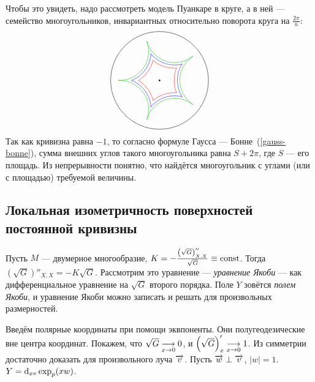 \documentclass[a4paper]{report}
\begin{document}
{{{            Чтобы это увидеть, надо рассмотреть модель Пуанкаре в круге, а в ней --- семейство многоугольников, инвариантных относительно поворота круга на $\frac{2\pi}{n}$:
            \[\begin{tikzpicture}
                  \draw (0, 0) circle (2);
                  \fill (0, 0) circle (1pt);
                  \pgfmathsetmacro{\r}{1.4} %
                  \foreach \i in {0,1,...,4} {
                      \draw[red,smooth,domain={(2.2+\i)*72}:{(2.8+\i)*72}] plot ({\r*cos(\x)+2*cos(72*\i)}, {\r*sin(\x)+2*sin(72*\i)});
                  }
                  \pgfmathsetmacro{\r}{1.27} %
                  \foreach \i in {0,1,...,4} {
                    \draw[blue,smooth,domain={(2.05+\i)*72}:{(2.95+\i)*72}] plot ({\r*cos(\x)+2*cos(72*\i)}, {\r*sin(\x)+2*sin(72*\i)});
                  }
                  \pgfmathsetmacro{\r}{1.17} %
                  \foreach \i in {0,1,...,4} {
                    \draw[darkgreen,smooth,domain={(1.7+\i)*72}:{(3.3+\i)*72}] plot ({\r*cos(\x)+2*cos(72*\i)}, {\r*sin(\x)+2*sin(72*\i)});
                  }
            \end{tikzpicture}\]
            Так как кривизна равна $-1$, то согласно формуле Гаусса --- Бонне~(\cref{gauss-bonne}), сумма внешних углов такого многоугольника равна $S+2\pi$, где $S$ --- его площадь.
            Из непрерывности понятно, что найдётся многоугольник с углами (или с площадью) требуемой величины.\qedhere
            }
        }
    }
    \subsection{Локальная изометричность поверхностей постоянной кривизны}
    Пусть $M$ --- двумерное многообразие, $K = -\frac{\left(\sqrt{G}\right)''_{X,X}}{\sqrt{G}} \equiv \operatorname{const}$.
    Тогда $\left(\sqrt{G}\right)''_{X,X} = -K \sqrt{G}$.
    Рассмотрим это уравнение --- \emph{уравнение Якоби} --- как дифференциальное уравнение на $\sqrt{G}$ второго порядка.
    Поле $Y$ зовётся \emph{полем Якоби}, и уравнение Якоби можно записать и решать для произвольных размерностей.

    Введём полярные координаты при помощи эквпоненты.
    Они полугеодезические вне центра координат.
    Покажем, что $\sqrt{G} \underset{x \to 0}{\longrightarrow} 0$, и $\left(\sqrt{G}\right)'_{x} \underset{x \to 0}{\longrightarrow} 1$.
    Из симметрии достаточно доказать для произвольного луча $\overrightarrow{v}$.
    Пусть $\overrightarrow{w} \perp \overrightarrow{v}$, $|w| = 1$.
    $Y = \operatorname{d}\!_{xv} \exp_{p}(xw)$.
\end{document}
